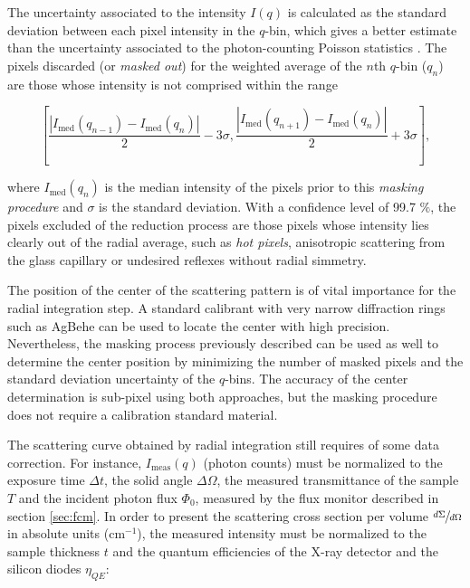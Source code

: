 The uncertainty associated to the intensity $I(q)$ is calculated as the standard deviation between each pixel intensity in the $q$-bin, which gives a better estimate than the uncertainty associated to the photon-counting Poisson statistics \citep{pauw_everything_2013}. The pixels discarded (or \emph{masked out}) for the weighted average of the $n$th $q$-bin ($q_n$) are those whose intensity is not comprised within the range 

\begin{equation}
\left[ \frac{\left|I_{\text{med}}\left( q_{n-1}\right)-I_{\text{med}}\left( q_{n}\right)\right|}{2} - 3 \sigma , \frac{\left|I_{\text{med}}\left( q_{n+1}\right)-I_{\text{med}}\left( q_{n}\right)\right|}{2} + 3 \sigma \right], 
\end{equation}

where $I_{\text{med}}\left( q_{n}\right)$ is the median intensity of the pixels prior to this \emph{masking procedure} and $\sigma$ is the standard deviation. With a confidence level of 99.7 $\%$, the pixels excluded of the reduction process are those pixels whose intensity lies clearly out of the radial average, such as \emph{hot pixels}, anisotropic scattering from the glass capillary or undesired reflexes without radial simmetry.

The position of the center of the scattering pattern is of vital importance for the radial integration step. A standard calibrant with very narrow diffraction rings such as AgBehe can be used to locate the center with high precision. Nevertheless, the masking process previously described can be used as well to determine the center position by minimizing the number of masked pixels and the standard deviation uncertainty of the $q$-bins. The accuracy of the center determination is sub-pixel using both approaches, but the masking procedure does not require a calibration standard material.

The scattering curve obtained by radial integration still requires of some data correction. For instance, $I_{\text{meas}}(q)$ (photon counts) must be normalized to the exposure time $\Delta t$, the solid angle $\Delta \Omega$, the measured transmittance of the sample $T$ and the incident photon flux $\Phi_0$, measured by the flux monitor described in section \ref{sec:fcm}. In order to present the scattering cross section per volume $\sfrac{d\Sigma}{d\Omega}$ in absolute units (cm$^{-1}$), the measured intensity must be normalized to the sample thickness $t$ and the quantum efficiencies of the X-ray detector and the silicon diodes $\eta_{QE}$: 

